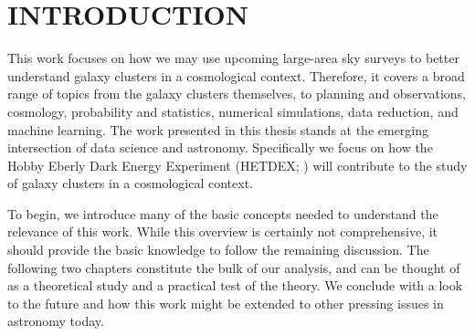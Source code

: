 %
%
%



\pagestyle{plain} %
\setcounter{page}{1}


\chapter[\uppercase{Introduction}]{\uppercase{Introduction}}

This work focuses on how we may use upcoming large-area sky surveys to better understand galaxy clusters in a cosmological context. Therefore, it covers a broad range of topics from the galaxy clusters themselves, to planning and observations, cosmology, probability and statistics, numerical simulations, data reduction, and machine learning. The work presented in this thesis stands at the emerging intersection of data science and astronomy. Specifically we focus on how the Hobby Eberly Dark Energy Experiment (HETDEX; \citealt{Hill2008}) will contribute to the study of galaxy clusters in a cosmological context.

To begin, we introduce many of the basic concepts needed to understand the relevance of this work. While this overview is certainly not comprehensive, it should provide the basic knowledge to follow the remaining discussion. The following two chapters constitute the bulk of our analysis, and can be thought of as a theoretical study and a practical test of the theory. We conclude with a look to the future and how this work might be extended to other pressing issues in astronomy today.

